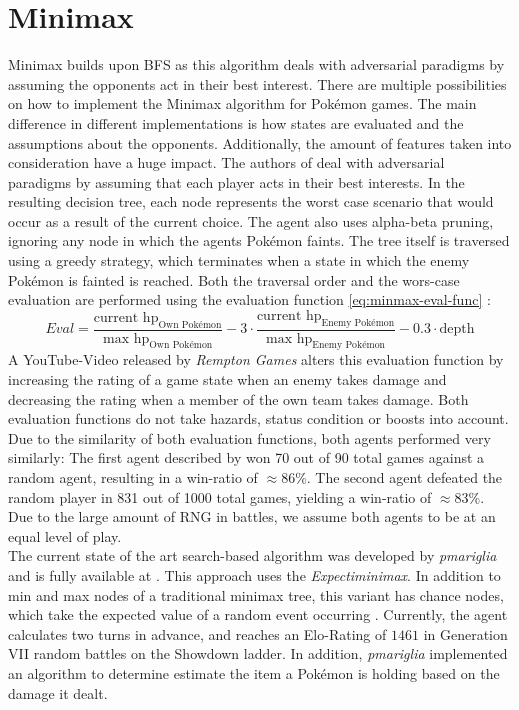 \section{Minimax}
\label{sec:related-minimax}
Minimax builds upon \ac{BFS} as this algorithm deals with adversarial paradigms by assuming the opponents 
act in their best interest.
There are multiple possibilities on how to implement the Minimax algorithm for Pokémon games. The main difference 
in different implementations is how states are evaluated and the assumptions about the opponents. Additionally,
the amount of features taken into consideration have a huge impact. The authors of \cite{Lee_Togelius_2017} deal
with adversarial paradigms by assuming that each player acts in their best interests. In the resulting decision 
tree, each node represents the worst case scenario that would occur as a result of the current choice. The agent
also uses alpha-beta pruning, ignoring any node in which the agents Pokémon faints.
The tree itself is traversed using a greedy strategy, which terminates when a state in which the enemy 
Pokémon is fainted is reached. Both the traversal order and the wors-case evaluation are performed using
the evaluation function \ref{eq:minmax-eval-func} \cite{Lee_Togelius_2017}:
\begin{equation}
\label{eq:minmax-eval-func}
    Eval = \frac{\text{current hp}_{\text{Own Pokémon}}}{\text{max hp}_{\text{Own Pokémon}}} -
    3 \cdot \frac{\text{current hp}_{\text{Enemy Pokémon}}}{\text{max hp}_{\text{Enemy Pokémon}}} -
    0.3 \cdot \text{depth}
\end{equation}
A YouTube-Video released by \emph{Rempton Games} \cite{RemptonGames:PokemonAI} alters this evaluation function
by increasing the rating of a game state when an enemy takes damage and decreasing the rating when a member
of the own team takes damage. Both evaluation functions do not take hazards, status condition or boosts 
into account. Due to the similarity of both evaluation functions, both agents performed very similarly:
The first agent described by \cite{Lee_Togelius_2017} won 70 out of 90 total games against a random agent,
resulting in a win-ratio of $\approx 86\%$. The second agent defeated the random player in 831 out of 1000
total games, yielding a win-ratio of $\approx 83\%$. Due to the large amount of \ac{RNG} in battles, we assume
both agents to be at an equal level of play. \\
The current state of the art search-based algorithm was developed by \emph{pmariglia} and is fully available
at \cite{Github:pmariglia-showdown}. This approach uses the \textit{Expectiminimax}. In addition to \glqq min\grqq{}
and \glqq max\grqq{} nodes of a traditional minimax tree, this variant has \glqq chance\grqq{} nodes, which take the 
expected value of a random event occurring \cite{wiki:Expectiminimax}. Currently, the agent calculates two turns in
advance, and reaches an Elo-Rating of $1461$ in Generation VII random battles on the Showdown ladder. 
In addition, \emph{pmariglia} implemented an algorithm to determine estimate the item a Pokémon is holding
based on the damage it dealt. 

